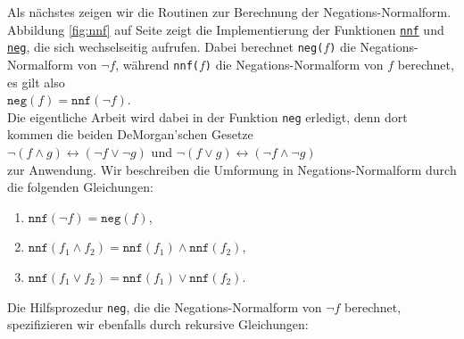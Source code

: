 Als n\"{a}chstes zeigen wir die Routinen zur Berechnung der Negations-Normalform.
Abbildung
\ref{fig:nnf} auf Seite \pageref{fig:nnf} zeigt die Implementierung der Funktionen
\href{https://github.com/karlstroetmann/Logik/blob/master/SetlX/knf.stlx}{\texttt{nnf}} und
\href{https://github.com/karlstroetmann/Logik/blob/master/SetlX/knf.stlx}{\texttt{neg}},
die sich wechselseitig aufrufen.  Dabei berechnet \texttt{neg($f$)}
die Negations-Normalform von $\neg f$, w\"{a}hrend \texttt{nnf($f$)} die
Negations-Normalform von $f$ berechnet, es gilt also
\\[0.2cm]
\hspace*{1.3cm}
$\mathtt{neg}(f) = \mathtt{nnf}(\neg f)$.
\\[0.2cm]
  Die eigentliche Arbeit wird dabei in der
Funktion \texttt{neg} erledigt, denn dort kommen die beiden DeMorgan'schen Gesetze \\[0.2cm]
\hspace*{1.3cm} $\neg (f \wedge g) \leftrightarrow (\neg f \vee \neg g)$ \quad und \quad $\neg (f \vee g) \leftrightarrow (\neg f \wedge \neg g)$ \\[0.2cm]
zur Anwendung.  Wir beschreiben die Umformung in Negations-Normalform durch 
die folgenden Gleichungen:
\begin{enumerate}
\item $\texttt{nnf}(\neg f) = \mathtt{neg}(f)$,
\item $\texttt{nnf}(f_1 \wedge f_2) = \mathtt{nnf}(f_1) \wedge \mathtt{nnf}(f_2)$,
\item $\texttt{nnf}(f_1 \vee f_2) = \mathtt{nnf}(f_1) \vee \mathtt{nnf}(f_2)$.
\end{enumerate}
Die Hilfsprozedur \texttt{neg}, die die Negations-Normalform von $\neg f$ berechnet,
spezifizieren wir ebenfalls durch rekursive Gleichungen:
